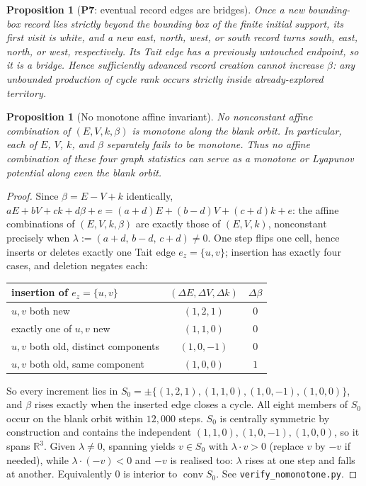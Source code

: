 \documentclass[11pt,reqno]{amsart}
\theoremstyle{plain}
\newtheorem{proposition}[theorem]{Proposition}
\theoremstyle{definition}
\newcommand{\PN}[1]{\textbf{P#1}}
\begin{document}
\begin{proposition}[\PN{7}: eventual record edges are bridges]\label{prop:record}
Once a new bounding-box record lies strictly beyond the bounding box of the finite
initial support, its first visit is white, and a new east, north, west, or south
record turns south, east, north, or west, respectively. Its Tait edge has a
previously untouched endpoint, so it is a bridge. Hence sufficiently advanced
record creation cannot increase $\beta$: any unbounded production of cycle rank
occurs strictly inside already-explored territory.
\end{proposition}

\begin{proposition}[No monotone affine invariant]\label{rem:nomonotone}
No nonconstant affine combination of $(E,V,k,\beta)$ is monotone along the blank
orbit. In particular, each of $E$, $V$, $k$, and $\beta$ separately fails to be
monotone. Thus no affine combination of these four graph statistics can serve as
a monotone or Lyapunov potential along even the blank orbit.
\end{proposition}

\begin{proof}
Since $\beta=E-V+k$ identically, $aE+bV+ck+d\beta+e=(a+d)E+(b-d)V+(c+d)k+e$: the
affine combinations of $(E,V,k,\beta)$ are exactly those of $(E,V,k)$, nonconstant
precisely when $\lambda:=(a+d,\,b-d,\,c+d)\neq0$. One step flips one cell, hence
inserts or deletes exactly one Tait edge $e_z=\{u,v\}$; insertion has exactly four
cases, and deletion negates each:
\begin{center}
\begin{tabular}{@{}lcc@{}}
\toprule
insertion of $e_z=\{u,v\}$ & $(\Delta E,\Delta V,\Delta k)$ & $\Delta\beta$\\
\midrule
$u,v$ both new & $(1,2,1)$ & $0$\\
exactly one of $u,v$ new & $(1,1,0)$ & $0$\\
$u,v$ both old, distinct components & $(1,0,-1)$ & $0$\\
$u,v$ both old, same component & $(1,0,0)$ & $1$\\
\bottomrule
\end{tabular}
\end{center}
So every increment lies in
$S_0=\pm\{(1,2,1),(1,1,0),(1,0,-1),(1,0,0)\}$, and $\beta$ rises exactly when the
inserted edge closes a cycle. All eight members of $S_0$ occur on the blank orbit
within $12{,}000$ steps. $S_0$ is centrally symmetric by construction and contains
the independent $(1,1,0),(1,0,-1),(1,0,0)$, so it spans $\mathbb{R}^3$. Given
$\lambda\neq0$, spanning yields $v\in S_0$ with $\lambda\cdot v>0$ (replace $v$ by
$-v$ if needed), while $\lambda\cdot(-v)<0$ and $-v$ is realised too: $\lambda$
rises at one step and falls at another. Equivalently $0$ is interior to
$\operatorname{conv}S_0$. See \texttt{verify\_nomonotone.py}.
\end{proof}
\end{document}

